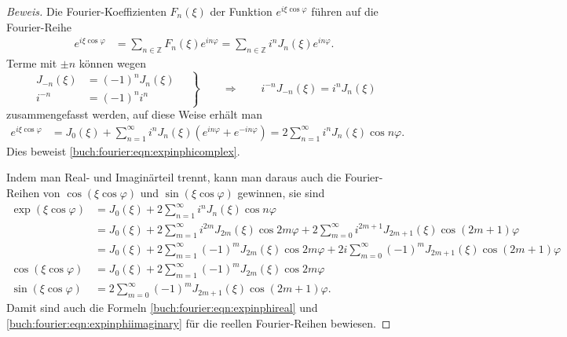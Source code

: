 \begin{proof}[Beweis]
Die Fourier-Koeffizienten $F_n(\xi)$ der Funktion $e^{i\xi\cos\varphi}$
führen auf die Fourier-Reihe
\begin{align*}
e^{i\xi\cos\varphi}
&=
\sum_{n\in\mathbb{Z}} F_n(\xi) e^{in\varphi}
=
\sum_{n\in\mathbb{Z}} i^n J_n(\xi) e^{in\varphi}.
\end{align*}
Terme mit $\pm n$ können wegen
\[
\left.
\begin{aligned}
J_{-n}(\xi) &= (-1)^n J_n(\xi) 
\\
i^{-n}&=(-1)^n i^n
\end{aligned}
\quad
\right\}
\qquad\Rightarrow\qquad
i^{-n}J_{-n}(\xi) = i^n J_n(\xi)
\]
zusammengefasst werden, auf diese Weise erhält man 
\begin{align*}
e^{i\xi\cos\varphi}
&=
J_0(\xi)
+
\sum_{n=1}^\infty i^n J_n(\xi) (e^{in\varphi}+e^{-in\varphi})
=
2\sum_{n=1}^\infty i^n J_n(\xi) \cos n\varphi.
\end{align*}
Dies beweist
\eqref{buch:fourier:eqn:expinphicomplex}.

Indem man Real- und Imaginärteil trennt, kann man daraus auch
die Fourier-Reihen von $\cos(\xi\cos\varphi)$ und
$\sin(\xi\cos\varphi)$ gewinnen, sie sind
\begin{align*}
\exp(\xi\cos\varphi)
&=
J_0(\xi) + 2\sum_{n=1}^\infty i^{n} J_{n}(\xi) \cos n\varphi
\\
&=
J_0(\xi)
+
2\sum_{m=1}^\infty i^{2m}J_{2m}(\xi)\cos 2m\varphi
+
2\sum_{m=0}^\infty i^{2m+1}J_{2m+1}(\xi)\cos(2m+1)\varphi
\\
&=
J_0(\xi)
+
2\sum_{m=1}^\infty (-1)^{m}J_{2m}(\xi)\cos 2m\varphi
+
2i\sum_{m=0}^\infty (-1)^{m}J_{2m+1}(\xi)\cos(2m+1)\varphi
\\
\cos(\xi\cos\varphi)
&=
J_0(\xi)
+
2\sum_{m=1}^\infty (-1)^{m}J_{2m}(\xi)\cos 2m\varphi
\\
\sin(\xi\cos\varphi)
&=
2\sum_{m=0}^\infty (-1)^m J_{2m+1}(\xi) \cos(2m+1)\varphi.
\end{align*}
Damit sind auch die Formeln
\eqref{buch:fourier:eqn:expinphireal}
und
\eqref{buch:fourier:eqn:expinphiimaginary}
für die reellen Fourier-Reihen bewiesen.
\end{proof}

%
%
